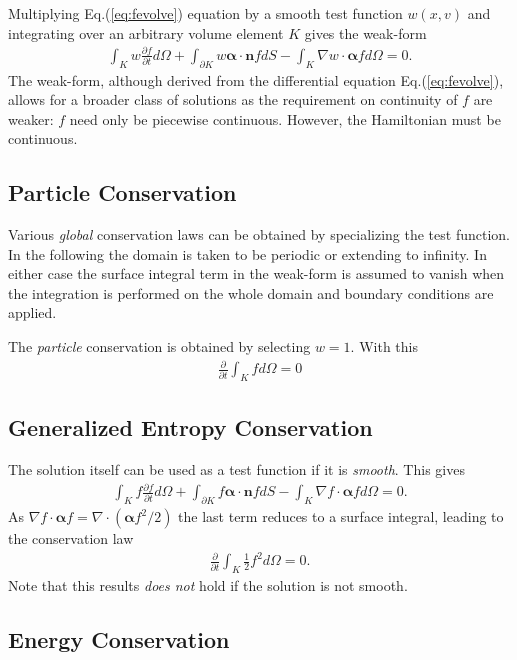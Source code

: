 \documentclass[11pt, reqno]{amsart}
\newcommand{\eqr}[1]{Eq.\thinspace(#1)}
\newcommand{\pfrac}[2]{\frac{\partial #1}{\partial #2}}
\newcommand{\pfraca}[1]{\frac{\partial}{\partial #1}}
\newcommand{\mvec}[1]{\mathbf{#1}}
\newcommand{\gvec}[1]{\boldsymbol{#1}}
\theoremstyle{definition}
\begin{document}
Multiplying \eqr{\ref{eq:fevolve}} equation by a smooth test function
$w(x,v)$ and integrating over an arbitrary volume element $K$ gives
the weak-form
\begin{align}
  \int_K w\pfrac{f}{t}d\Omega 
  + \int_{\partial K}w \gvec{\alpha}\cdot\mvec{n}f dS
  - \int_K \nabla w \cdot \gvec{\alpha} f d\Omega
 = 0. \label{eq:weak-form}
\end{align}
The weak-form, although derived from the differential equation
\eqr{\ref{eq:fevolve}}, allows for a broader class of solutions as the
requirement on continuity of $f$ are weaker: $f$ need only be
piecewise continuous. However, the Hamiltonian must be continuous.

\subsection{Particle Conservation}

Various \emph{global} conservation laws can be obtained by
specializing the test function. In the following the domain is taken
to be periodic or extending to infinity. In either case the surface
integral term in the weak-form is assumed to vanish when the
integration is performed on the whole domain and boundary conditions
are applied.

The \emph{particle} conservation is obtained by selecting $w=1$. With
this
\begin{align}
  \pfraca{t}\int_K f d\Omega = 0
\end{align}

\subsection{Generalized Entropy Conservation}
The solution itself can be used as a test function if it is
\emph{smooth}. This gives
\begin{align}
  \int_K f\pfrac{f}{t}d\Omega 
  + \int_{\partial K}f \gvec{\alpha}\cdot\mvec{n}f dS
  - \int_K \nabla f \cdot \gvec{\alpha} f d\Omega
 = 0.
\end{align}
As $\nabla f \cdot \gvec{\alpha} f = \nabla\cdot (\gvec{\alpha}
f^2/2)$ the last term reduces to a surface integral, leading to the
conservation law
\begin{align}
  \pfraca{t}\int_K \frac{1}{2}f^2 d\Omega = 0.
\end{align}
Note that this results \emph{does not} hold if the solution is not
smooth.

\subsection{Energy Conservation}
\end{document}
